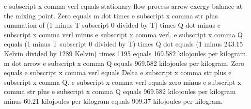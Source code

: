e subscript x comma verl equals stationary flow process arrow exergy balance at the mixing point.  
Zero equals m dot times e subscript x comma str plus summation of (1 minus T subscript 0 divided by T) times Q dot minus e subscript x comma verl minus e subscript x comma verl.  
e subscript x comma Q equals (1 minus T subscript 0 divided by T) times Q dot equals (1 minus 243.15 Kelvin divided by 1289 Kelvin) times 1195 equals 169.582 kilojoules per kilogram.  
m dot arrow e subscript x comma Q equals 969.582 kilojoules per kilogram.  
Zero equals e subscript x comma verl equals Delta e subscript x comma str plus e subscript x comma Q.  
e subscript x comma verl equals zero minus e subscript x comma str plus e subscript x comma Q equals 969.582 kilojoules per kilogram minus 60.21 kilojoules per kilogram equals 909.37 kilojoules per kilogram.
